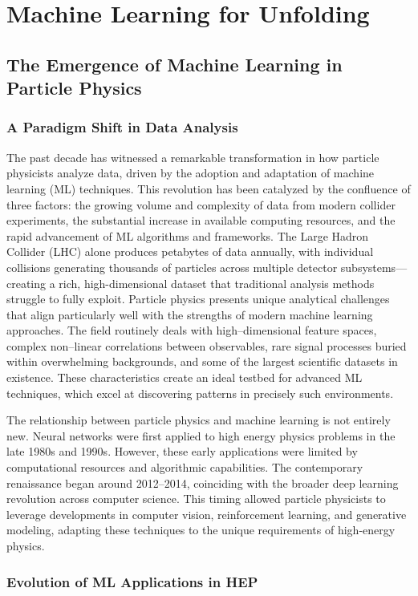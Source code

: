 \chapter{Machine Learning for Unfolding}
\section{The Emergence of Machine Learning in Particle Physics}
\subsection{A Paradigm Shift in Data Analysis}
The past decade has witnessed a remarkable transformation in how particle physicists analyze data, driven by the adoption and adaptation of machine learning (ML) techniques.
%
This revolution has been catalyzed by the confluence of three factors: the growing volume and complexity of data from modern collider experiments, the substantial increase in available computing resources, and the rapid advancement of ML algorithms and frameworks.
%
The Large Hadron Collider (LHC) alone produces petabytes of data annually, with individual collisions generating thousands of particles across multiple detector subsystems—creating a rich, high-dimensional dataset that traditional analysis methods struggle to fully exploit.
%
Particle physics presents unique analytical challenges that align particularly well with the strengths of modern machine learning approaches.
%
The field routinely deals with high--dimensional feature spaces, complex non--linear correlations between observables, rare signal processes buried within overwhelming backgrounds, and some of the largest scientific datasets in existence.
%
These characteristics create an ideal testbed for advanced ML techniques, which excel at discovering patterns in precisely such environments.
%

The relationship between particle physics and machine learning is not entirely new.
%
Neural networks were first applied to high energy physics problems in the late 1980s and 1990s.
%
However, these early applications were limited by computational resources and algorithmic capabilities.
%
The contemporary renaissance began around 2012--2014, coinciding with the broader deep learning revolution across computer science.
%
This timing allowed particle physicists to leverage developments in computer vision, reinforcement learning, and generative modeling, adapting these techniques to the unique requirements of high-energy physics.
\subsection{Evolution of ML Applications in HEP}
